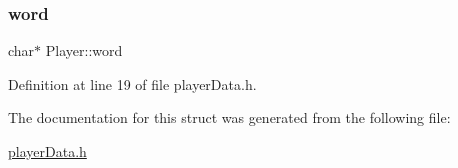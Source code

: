 \subsubsection{\texorpdfstring{word}{word}}
{\footnotesize\ttfamily char$\ast$ Player\+::word}



Definition at line 19 of file player\+Data.\+h.



The documentation for this struct was generated from the following file\+:\begin{DoxyCompactItemize}
\item 
\hyperlink{player_data_8h}{player\+Data.\+h}\end{DoxyCompactItemize}
